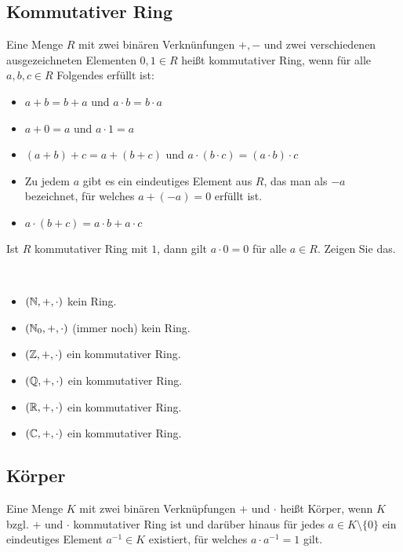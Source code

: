 \subsection{Kommutativer Ring} 

\begin{defn}
	Eine Menge $R$ mit zwei binären Verknünfungen $+, -$ und zwei verschiedenen ausgezeichneten Elementen $0, 1 \in R$ heißt kommutativer Ring, wenn für alle $a,b,c \in R$ Folgendes erfüllt ist: 
	\begin{itemize}
		\item $a + b =b +a$ und $a \cdot b = b \cdot a$ 
		\item $a + 0 = a$ und $a \cdot 1 = a$ 
		\item $(a+b)+c = a+(b+c)$ und $a \cdot (b \cdot c) = (a \cdot b) \cdot c$
		\item Zu jedem $a$ gibt es ein eindeutiges Element aus $R$, das man als $-a$ bezeichnet, für welches $a+(-a)=0$ erfüllt ist. 
		\item $a \cdot (b+c) = a \cdot b + a \cdot c$
	\end{itemize} 
\end{defn}

\begin{aufg} 
	Ist $R$ kommutativer Ring mit $1$, dann gilt $a \cdot 0=0$ für alle $a \in R$. Zeigen Sie das. 
\end{aufg} 

\begin{bsp}\ 
\begin{itemize}
		\item $(\mathbb{N},+,\cdot)$ kein Ring. 
		\item $(\mathbb{N}_0,+,\cdot)$ (immer noch) kein Ring. 
		\item $(\mathbb{Z},+,\cdot)$ ein kommutativer Ring. 
		\item $(\mathbb{Q},+,\cdot)$ ein kommutativer Ring. 
		\item $(\mathbb{R},+,\cdot)$ ein kommutativer Ring. 
		\item $(\mathbb{C},+,\cdot)$ ein kommutativer Ring. 
\end{itemize} 
\end{bsp} 

\subsection{Körper} 

\begin{defn}
	Eine Menge $K$ mit zwei binären Verknüpfungen $+$ und $\cdot$ heißt Körper, wenn $K$ bzgl. $+$ und $\cdot$ kommutativer Ring ist und darüber hinaus für jedes $a \in K \setminus \{0\}$ ein eindeutiges Element $a^{-1} \in K$ existiert, für welches $a \cdot a^{-1}  = 1$ gilt. 
\end{defn} 

